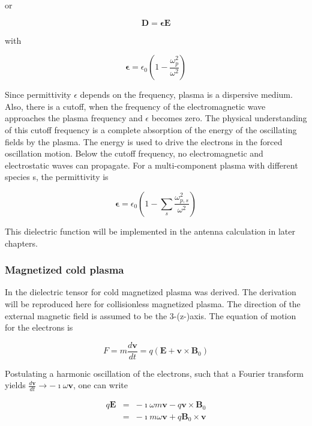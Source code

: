 \documentclass[a4paper,11pt]{thesis}
\begin{document}
or

\begin{equation}\label{D_plasma}
    \mathbf{D}=\mathbf{\epsilon}  \mathbf{E}
\end{equation}

with

\begin{equation}\label{epsilon_plasma}
   \mathbf{ \epsilon}=\epsilon_0 \left(1-\frac{\omega_p^2 }{ \omega^2 }\right)
\end{equation}

Since permittivity $\epsilon$ depends on the frequency, plasma is a dispersive medium. Also, there is a cutoff, when the frequency of the electromagnetic wave approaches the plasma frequency and $\epsilon$ becomes zero. The physical understanding of this cutoff frequency is a complete absorption of the energy of the oscillating fields by the plasma. The energy is used to drive the electrons in the forced oscillation motion. Below the cutoff frequency, no electromagnetic and electrostatic waves can propagate. For a multi-component plasma with different species s, the permittivity is

\begin{equation}
   \mathbf{ \epsilon}=\epsilon_0 \left(1-\sum_s \frac{\omega_{p,s}^2 }{ \omega^2 } \right)
\end{equation}

This dielectric function will be implemented in the antenna calculation in later chapters.
\subsubsection{Magnetized cold plasma}
In \cite{my_masterthesis} the dielectric tensor for cold magnetized plasma was derived. The derivation will be reproduced here for collisionless magnetized plasma.  The direction of the external magnetic field is assumed to be the 3-(z-)axis. The equation of motion for the electrons is

\begin{equation}\label{eq_of_motion_electrons}
    F=m\frac{d\mathbf{v}}{dt}=q(\mathbf{E}+\mathbf{v} \times \mathbf{B}_0)
\end{equation}

Postulating a harmonic oscillation of the electrons, such that a Fourier transform yields $\frac{d\mathbf{v}}{dt}\rightarrow-\imath \omega \mathbf{v}$, one can write

\begin{eqnarray}
    q\mathbf{E}&=&-\imath \omega m \mathbf{v}-q\mathbf{v} \times \mathbf{B}_0\\
&=& -\imath m \omega \mathbf{v} +q \mathbf{B}_0 \times \mathbf{v} \nonumber
\end{eqnarray}
\end{document}
